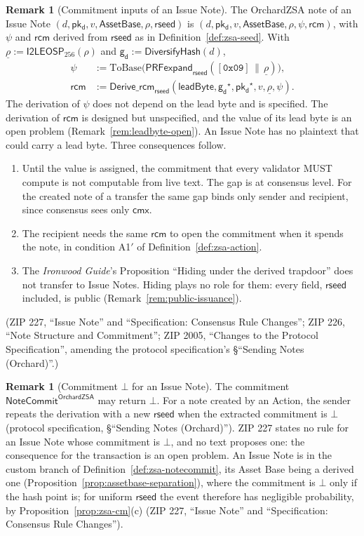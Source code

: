 \documentclass[11pt,a4paper]{article}
\theoremstyle{definition}
\newtheorem{remark}[theorem]{Remark}
\newcommand{\cmx}{\mathsf{cmx}}
\newcommand{\NoteCommit}{\ensuremath{\mathsf{NoteCommit}}}
\newcommand{\pkd}{\ensuremath{\mathsf{pk_d}}}
\newcommand{\gd}{\ensuremath{\mathsf{g_d}}}
\newcommand{\rcm}{\ensuremath{\mathsf{rcm}}}
\begin{document}
\begin{remark}[Commitment inputs of an Issue Note]\label{rem:issue-cm-open}
The OrchardZSA note of an Issue Note
$(d, \pkd, v, \mathsf{AssetBase}, \rho, \mathsf{rseed})$ is
$(d, \pkd, v, \mathsf{AssetBase}, \rho, \psi, \rcm)$, with $\psi$ and $\rcm$
derived from $\mathsf{rseed}$ as in Definition~\ref{def:zsa-seed}. With
$\underline{\rho} := \mathsf{I2LEOSP}_{256}(\rho)$ and
$\gd := \mathsf{DiversifyHash}(d)$,
\begin{align*}
  \psi &:= \mathrm{ToBase}\bigl(\mathsf{PRFexpand}_{\mathsf{rseed}}(
    [\mathtt{0x09}] \,\|\, \underline{\rho})\bigr), \\
  \rcm &:= \mathsf{Derive\_rcm}_{\mathsf{rseed}}(\mathsf{leadByte},
    \gd^{\star}, \pkd^{\star}, v, \underline{\rho}, \psi).
\end{align*}
The derivation of $\psi$ does not depend on the lead byte and is specified.
The derivation of $\rcm$ is designed but unspecified, and the value of its
lead byte is an open problem (Remark~\ref{rem:leadbyte-open}). An Issue
Note has no plaintext that could carry a lead byte. Three consequences
follow.
\begin{enumerate}[label=(\alph*)]
\item Until the value is assigned, the commitment that every validator MUST
  compute is not computable from live text. The gap is at consensus level.
  For the created note of a transfer the same gap binds only sender and
  recipient, since consensus sees only $\cmx$.
\item The recipient needs the same $\rcm$ to open the commitment when it
  spends the note, in condition A1$'$ of Definition~\ref{def:zsa-action}.
\item The \emph{Ironwood Guide}'s Proposition ``Hiding under the derived
  trapdoor'' does not transfer to Issue Notes. Hiding plays no role for
  them: every field, $\mathsf{rseed}$ included, is public
  (Remark~\ref{rem:public-issuance}).
\end{enumerate}
(ZIP 227, ``Issue Note'' and ``Specification: Consensus Rule Changes''; ZIP
226, ``Note Structure and Commitment''; ZIP 2005, ``Changes to the Protocol
Specification'', amending the protocol specification's \S``Sending Notes
(Orchard)''.)
\end{remark}

\begin{remark}[Commitment $\bot$ for an Issue Note]
The commitment $\NoteCommit^{\mathsf{OrchardZSA}}$ may return $\bot$. For a
note created by an Action, the sender repeats the derivation with a new
$\mathsf{rseed}$ when the extracted commitment is $\bot$ (protocol
specification, \S``Sending Notes (Orchard)''). ZIP 227 states no rule for
an Issue Note whose commitment is $\bot$, and no text proposes one: the
consequence for the transaction is an open problem. An Issue Note is in the
custom branch of Definition~\ref{def:zsa-notecommit}, its Asset Base being
a derived one (Proposition~\ref{prop:assetbase-separation}), where the
commitment is $\bot$ only if the hash point is; for uniform
$\mathsf{rseed}$ the event therefore has negligible probability, by
Proposition~\ref{prop:zsa-cm}(c) (ZIP 227, ``Issue Note'' and
``Specification: Consensus Rule Changes'').
\end{remark}
\end{document}
